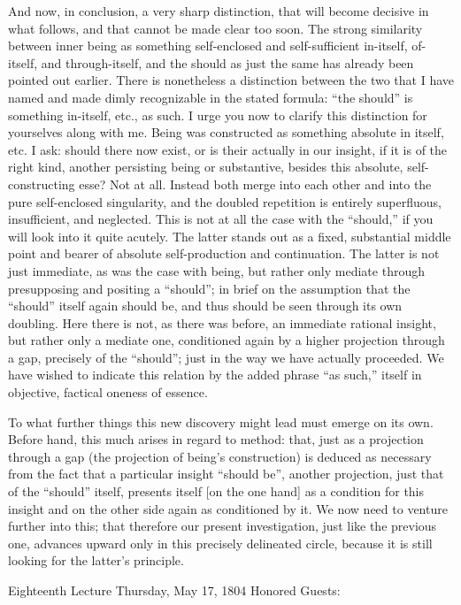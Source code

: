 And now, in conclusion, a very sharp distinction,
that will become decisive in what follows,
and that cannot be made clear too soon.
The strong similarity between inner being
as something self-enclosed and self-sufficient
in-itself, of-itself, and through-itself,
and the should as just the same
has already been pointed out earlier.
There is nonetheless a distinction
between the two that I have named
and made dimly recognizable in the stated formula:
“the should” is something in-itself, etc., as such.
I urge you now to clarify this distinction
for yourselves along with me.
Being was constructed as something absolute in itself, etc.
I ask: should there now exist,
or is their actually in our insight,
if it is of the right kind,
another persisting being or substantive,
besides this absolute, self-constructing esse?
Not at all.
Instead both merge into each other
and into the pure self-enclosed singularity,
and the doubled repetition is entirely
superfluous, insufficient, and neglected.
This is not at all the case with the “should,”
if you will look into it quite acutely.
The latter stands out as a fixed, substantial
middle point and bearer of
absolute self-production and continuation.
The latter is not just immediate,
as was the case with being,
but rather only mediate through
presupposing and positing a “should”;
in brief on the assumption that
the “should” itself again should be,
and thus should be seen through its own doubling.
Here there is not, as there was before,
an immediate rational insight,
but rather only a mediate one,
conditioned again by a higher
projection through a gap,
precisely of the “should”;
just in the way we have actually proceeded.
We have wished to indicate this relation
by the added phrase “as such,”
itself in objective, factical oneness of essence.

To what further things this new discovery
might lead  must emerge on its own.
Before hand, this much arises in regard to method:
that, just as a projection through a gap
(the projection of being's construction)
is deduced as necessary from the fact
that a particular insight “should be”,
another projection, just that of the “should” itself,
presents itself [on the one hand] as
a condition for this insight
and on the other side again as conditioned by it.
We now need to venture further into this;
that therefore our present investigation,
just like the previous one,
advances upward only in this
precisely delineated circle,
because it is still looking
for the latter's principle.

Eighteenth Lecture
Thursday, May 17, 1804
Honored Guests:

